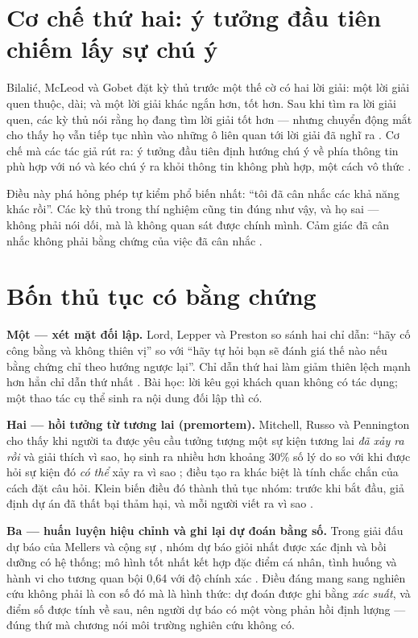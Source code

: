 \documentclass[../hieu-suat.tex]{subfiles}
\begin{document}
\section{Cơ chế thứ hai: ý tưởng đầu tiên chiếm lấy sự chú ý}

Bilalić, McLeod và Gobet \cite{bilalic2008} đặt kỳ thủ trước một thế cờ có hai lời giải: một lời giải quen thuộc, dài; và một lời giải khác ngắn hơn, tốt hơn. Sau khi tìm ra lời giải quen, các kỳ thủ nói rằng họ đang tìm lời giải tốt hơn --- nhưng chuyển động mắt cho thấy họ vẫn tiếp tục nhìn vào những ô liên quan tới lời giải đã nghĩ ra \nD{}. Cơ chế mà các tác giả rút ra: ý tưởng đầu tiên định hướng chú ý về phía thông tin phù hợp với nó và kéo chú ý ra khỏi thông tin không phù hợp, một cách vô thức \nT{}.

\begin{cambay}
Điều này phá hỏng phép tự kiểm phổ biến nhất: ``tôi đã cân nhắc các khả năng khác rồi''. Các kỳ thủ trong thí nghiệm cũng tin đúng như vậy, và họ sai --- không phải nói dối, mà là không quan sát được chính mình. Cảm giác đã cân nhắc không phải bằng chứng của việc đã cân nhắc \nM{}.
\end{cambay}

\section{Bốn thủ tục có bằng chứng}

\textbf{Một --- xét mặt đối lập.} Lord, Lepper và Preston \cite{lord1984} so sánh hai chỉ dẫn: ``hãy cố công bằng và không thiên vị'' so với ``hãy tự hỏi bạn sẽ đánh giá thế nào nếu bằng chứng chỉ theo hướng ngược lại''. Chỉ dẫn thứ hai làm giảm thiên lệch mạnh hơn hẳn chỉ dẫn thứ nhất \nD{}. Bài học: lời kêu gọi khách quan không có tác dụng; một thao tác cụ thể sinh ra nội dung đối lập thì có.

\textbf{Hai --- hồi tưởng từ tương lai (premortem).} Mitchell, Russo và Pennington \cite{mitchell1989} cho thấy khi người ta được yêu cầu tưởng tượng một sự kiện tương lai \emph{đã xảy ra rồi} và giải thích vì sao, họ sinh ra nhiều hơn khoảng 30\% số lý do so với khi được hỏi sự kiện đó \emph{có thể} xảy ra vì sao \nD{}; điều tạo ra khác biệt là tính chắc chắn của cách đặt câu hỏi. Klein \cite{klein2007} biến điều đó thành thủ tục nhóm: trước khi bắt đầu, giả định dự án đã thất bại thảm hại, và mỗi người viết ra vì sao \nT{}.

\textbf{Ba --- huấn luyện hiệu chỉnh và ghi lại dự đoán bằng số.} Trong giải đấu dự báo của Mellers và cộng sự \cite{mellers2015}, nhóm dự báo giỏi nhất được xác định và bồi dưỡng có hệ thống; mô hình tốt nhất kết hợp đặc điểm cá nhân, tình huống và hành vi cho tương quan bội 0,64 với độ chính xác \nD{}. Điều đáng mang sang nghiên cứu \nM{} không phải là con số đó mà là hình thức: dự đoán được ghi bằng \emph{xác suất}, và điểm số được tính về sau, nên người dự báo có một vòng phản hồi định lượng --- đúng thứ mà chương  nói môi trường nghiên cứu không có.
\end{document}
